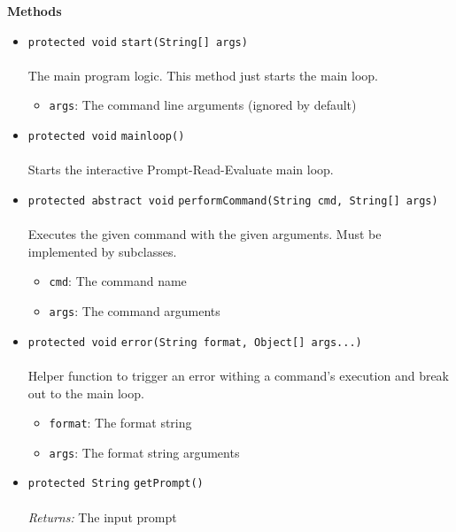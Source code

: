 \textbf{\sffamily Methods}
\begin{itemize}
\item \lstinline|protected void| \lstinline|start|\lstinline|(String[] args)|\\ \\[-0.6em]
The main program logic. This method just starts the main loop.
\begin{itemize}
\item \lstinline|args|: The command line arguments (ignored by default)
\end{itemize}



\item \lstinline|protected void| \lstinline|mainloop|\lstinline|()|\\ \\[-0.6em]
Starts the interactive Prompt-Read-Evaluate main loop.



\item \lstinline|protected abstract void| \lstinline|performCommand|\lstinline|(String cmd, String[] args)|\\ \\[-0.6em]
Executes the given command with the given arguments. Must be implemented by subclasses.
\begin{itemize}
\item \lstinline|cmd|: The command name
\item \lstinline|args|: The command arguments
\end{itemize}



\item \lstinline|protected void| \lstinline|error|\lstinline|(String format, Object[] args...)|\\ \\[-0.6em]
Helper function to trigger an error withing a command's execution and break out to
 the main loop.
\begin{itemize}
\item \lstinline|format|: The format string
\item \lstinline|args|: The format string arguments
\end{itemize}



\item \lstinline|protected String| \lstinline|getPrompt|\lstinline|()|\\ \\[-0.6em]
\emph{Returns:} The input prompt



\end{itemize}

